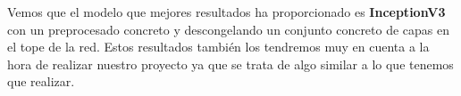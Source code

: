 \vspace{5 mm}

Vemos que el modelo que mejores resultados ha proporcionado es \textbf{InceptionV3} con un preprocesado concreto y descongelando un conjunto concreto de capas en el tope de la red. Estos resultados también los tendremos muy en cuenta a la hora de realizar nuestro proyecto ya que se trata de algo similar a lo que tenemos que realizar.
